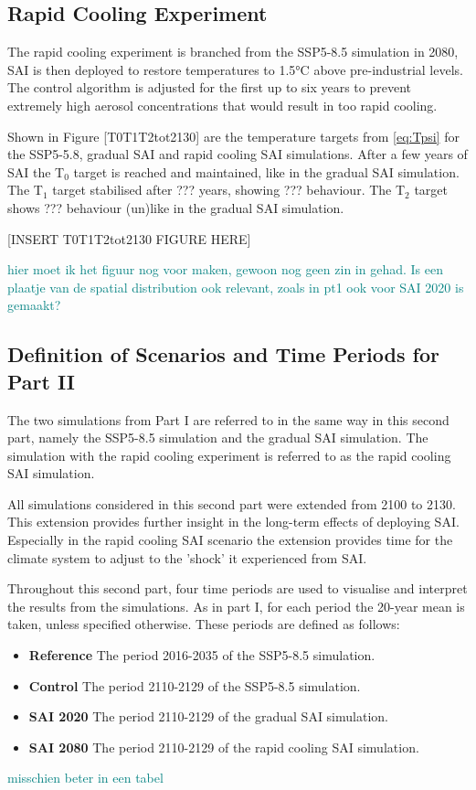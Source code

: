 \subsection{Rapid Cooling Experiment}
The rapid cooling experiment is branched from the SSP5-8.5 simulation in 2080, SAI is then deployed to restore temperatures to 1.5°C above pre-industrial levels. The control algorithm is adjusted for the first up to six years to prevent extremely high aerosol concentrations that would result in too rapid cooling. 

Shown in Figure [T0T1T2tot2130] are the temperature targets from \ref{eq:Tpsi} for the SSP5-5.8, gradual SAI and rapid cooling SAI simulations. After a few years of SAI the T$_0$ target is reached and maintained, like in the gradual SAI simulation. The T$_1$ target stabilised after ??? years, showing ??? behaviour. The T$_2$ target shows ??? behaviour (un)like in the gradual SAI simulation.

[INSERT T0T1T2tot2130 FIGURE HERE]

\textcolor{teal}{hier moet ik het figuur nog voor maken, gewoon nog geen zin in gehad. Is een plaatje van de spatial distribution ook relevant, zoals in pt1 ook voor SAI 2020 is gemaakt?}


\subsection{Definition of Scenarios and Time Periods for Part II}
The two simulations from Part I are referred to in the same way in this second part, namely the SSP5-8.5 simulation and the gradual SAI simulation. The simulation with the rapid cooling experiment is referred to as the rapid cooling SAI simulation. 

All simulations considered in this second part were extended from 2100 to 2130. This extension provides further insight in the long-term effects of deploying SAI. Especially in the rapid cooling SAI scenario the extension provides time for the climate system to adjust to the 'shock' it experienced from SAI. 

Throughout this second part, four time periods are used to visualise and interpret the results from the simulations. As in part I, for each period the 20-year mean is taken, unless specified otherwise. These periods are defined as follows:

\begin{itemize}
    \item \textbf{Reference} The period 2016-2035 of the SSP5-8.5 simulation.
    \item \textbf{Control} The period 2110-2129 of the SSP5-8.5 simulation.
    \item \textbf{SAI 2020} The period 2110-2129 of the gradual SAI simulation.
    \item \textbf{SAI 2080} The period 2110-2129 of the rapid cooling SAI simulation.
\end{itemize} 
\textcolor{teal}{misschien beter in een tabel}


